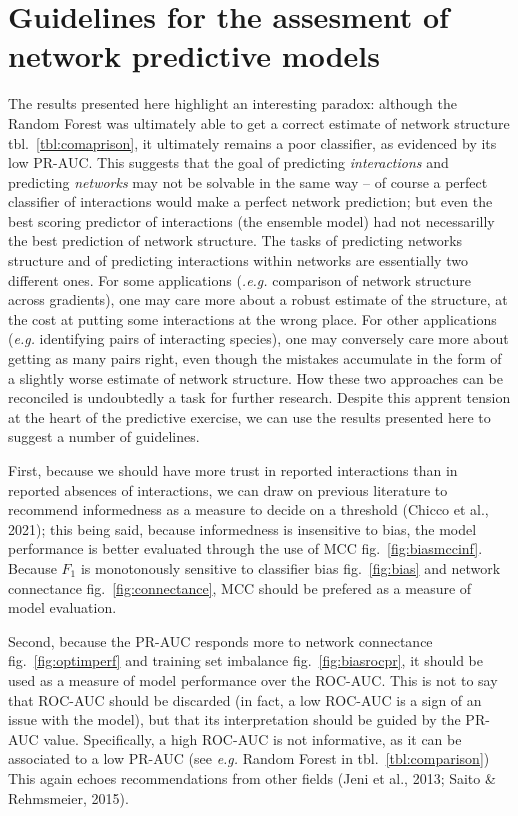 \documentclass[11pt]{article}
\begin{document}
\hypertarget{guidelines-for-the-assesment-of-network-predictive-models}{%
\section{Guidelines for the assesment of network predictive
models}\label{guidelines-for-the-assesment-of-network-predictive-models}}

The results presented here highlight an interesting paradox: although
the Random Forest was ultimately able to get a correct estimate of
network structure tbl.~\ref{tbl:comaprison}, it ultimately remains a
poor classifier, as evidenced by its low PR-AUC. This suggests that the
goal of predicting \emph{interactions} and predicting \emph{networks}
may not be solvable in the same way -- of course a perfect classifier of
interactions would make a perfect network prediction; but even the best
scoring predictor of interactions (the ensemble model) had not
necessarilly the best prediction of network structure. The tasks of
predicting networks structure and of predicting interactions within
networks are essentially two different ones. For some applications
(\emph{.e.g.} comparison of network structure across gradients), one may
care more about a robust estimate of the structure, at the cost at
putting some interactions at the wrong place. For other applications
(\emph{e.g.} identifying pairs of interacting species), one may
conversely care more about getting as many pairs right, even though the
mistakes accumulate in the form of a slightly worse estimate of network
structure. How these two approaches can be reconciled is undoubtedly a
task for further research. Despite this apprent tension at the heart of
the predictive exercise, we can use the results presented here to
suggest a number of guidelines.

First, because we should have more trust in reported interactions than
in reported absences of interactions, we can draw on previous literature
to recommend informedness as a measure to decide on a threshold (Chicco
et al., 2021); this being said, because informedness is insensitive to
bias, the model performance is better evaluated through the use of MCC
fig.~\ref{fig:biasmccinf}. Because \(F_1\) is monotonously sensitive to
classifier bias fig.~\ref{fig:bias} and network connectance
fig.~\ref{fig:connectance}, MCC should be prefered as a measure of model
evaluation.

Second, because the PR-AUC responds more to network connectance
fig.~\ref{fig:optimperf} and training set imbalance
fig.~\ref{fig:biasrocpr}, it should be used as a measure of model
performance over the ROC-AUC. This is not to say that ROC-AUC should be
discarded (in fact, a low ROC-AUC is a sign of an issue with the model),
but that its interpretation should be guided by the PR-AUC value.
Specifically, a high ROC-AUC is not informative, as it can be associated
to a low PR-AUC (see \emph{e.g.} Random Forest in
tbl.~\ref{tbl:comparison}) This again echoes recommendations from other
fields (Jeni et al., 2013; Saito \& Rehmsmeier, 2015).
\end{document}
